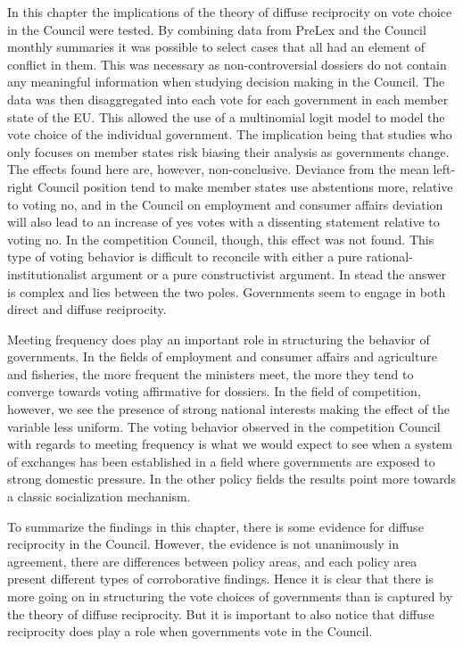 In this chapter the implications of the theory of diffuse reciprocity on vote choice in the Council were tested. By combining data from PreLex and the Council monthly summaries it was possible to select cases that all had an element of conflict in them. This was necessary as non-controversial dossiers do not contain any meaningful information when studying decision making in the Council. The data was then disaggregated into each vote for each government in each member state of the EU. This allowed the use of a multinomial logit model to model the vote choice of the individual government. The implication being that studies who only focuses on member states risk biasing their analysis as governments change. The effects found here are, however, non-conclusive. Deviance from the mean left-right Council position tend to make member states use abstentions more, relative to voting no, and in the Council on employment and consumer affairs deviation will also lead to an increase of yes votes with a dissenting statement relative to voting no. In the  competition Council, though, this effect was not found. This type of voting behavior is difficult to reconcile with either a pure rational-institutionalist argument or a pure constructivist argument. In stead the answer is complex and lies between the two poles. Governments seem to engage in both direct and diffuse reciprocity.

Meeting frequency does play an important role in structuring the behavior of governments. In the fields of employment and consumer affairs and agriculture and fisheries, the more frequent the ministers meet, the more they tend to converge towards voting affirmative for dossiers. In the field of competition, however, we see the presence of strong national interests making the effect of the variable less uniform. The voting behavior observed in the competition Council with regards to meeting frequency is what we would expect to see when a system of exchanges has been established in a field where governments are exposed to strong domestic pressure. In the other policy fields the results point more towards a classic socialization mechanism. 

To summarize the findings in this chapter, there is some evidence for diffuse reciprocity in the Council. However, the evidence is not unanimously in agreement, there are differences between policy areas, and each policy area present different types of corroborative findings. Hence it is clear that there is more going on in structuring the vote choices of governments than is captured by the theory of diffuse reciprocity. But it is important to also notice that diffuse reciprocity does play a role when governments vote in the Council. 




